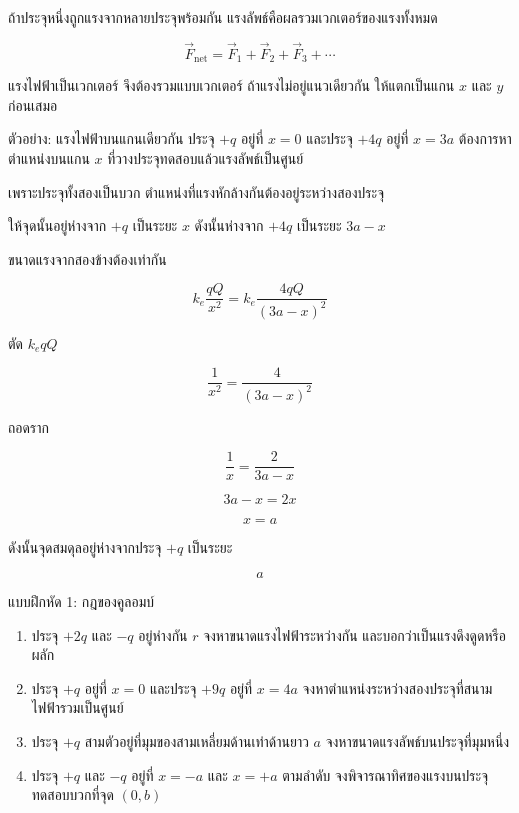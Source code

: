 ถ้าประจุหนึ่งถูกแรงจากหลายประจุพร้อมกัน แรงลัพธ์คือผลรวมเวกเตอร์ของแรงทั้งหมด

\[
\vec{F}_{\text{net}}=\vec{F}_1+\vec{F}_2+\vec{F}_3+\cdots
\]

\begin{tcolorbox}[title=ข้อควรจำสำหรับโจทย์หลายประจุ]
แรงไฟฟ้าเป็นเวกเตอร์ จึงต้องรวมแบบเวกเตอร์ ถ้าแรงไม่อยู่แนวเดียวกัน ให้แตกเป็นแกน $x$ และ $y$ ก่อนเสมอ
\end{tcolorbox}

\begin{examplebox}{ตัวอย่าง: แรงไฟฟ้าบนแกนเดียวกัน}
ประจุ $+q$ อยู่ที่ $x=0$ และประจุ $+4q$ อยู่ที่ $x=3a$ ต้องการหาตำแหน่งบนแกน $x$ ที่วางประจุทดสอบแล้วแรงลัพธ์เป็นศูนย์

เพราะประจุทั้งสองเป็นบวก ตำแหน่งที่แรงหักล้างกันต้องอยู่ระหว่างสองประจุ

ให้จุดนั้นอยู่ห่างจาก $+q$ เป็นระยะ $x$ ดังนั้นห่างจาก $+4q$ เป็นระยะ $3a-x$

ขนาดแรงจากสองข้างต้องเท่ากัน

\[
k_e\frac{qQ}{x^2}=k_e\frac{4qQ}{(3a-x)^2}
\]

ตัด $k_e qQ$

\[
\frac{1}{x^2}=\frac{4}{(3a-x)^2}
\]

ถอดราก

\[
\frac{1}{x}=\frac{2}{3a-x}
\]

\[
3a-x=2x
\]

\[
x=a
\]

ดังนั้นจุดสมดุลอยู่ห่างจากประจุ $+q$ เป็นระยะ

\[
\boxed{a}
\]
\end{examplebox}

\begin{exercisebox}{แบบฝึกหัด 1: กฎของคูลอมบ์}
\begin{enumerate}
    \item ประจุ $+2q$ และ $-q$ อยู่ห่างกัน $r$ จงหาขนาดแรงไฟฟ้าระหว่างกัน และบอกว่าเป็นแรงดึงดูดหรือผลัก
    \item ประจุ $+q$ อยู่ที่ $x=0$ และประจุ $+9q$ อยู่ที่ $x=4a$ จงหาตำแหน่งระหว่างสองประจุที่สนามไฟฟ้ารวมเป็นศูนย์
    \item ประจุ $+q$ สามตัวอยู่ที่มุมของสามเหลี่ยมด้านเท่าด้านยาว $a$ จงหาขนาดแรงลัพธ์บนประจุที่มุมหนึ่ง
    \item ประจุ $+q$ และ $-q$ อยู่ที่ $x=-a$ และ $x=+a$ ตามลำดับ จงพิจารณาทิศของแรงบนประจุทดสอบบวกที่จุด $(0,b)$
\end{enumerate}
\end{exercisebox}

